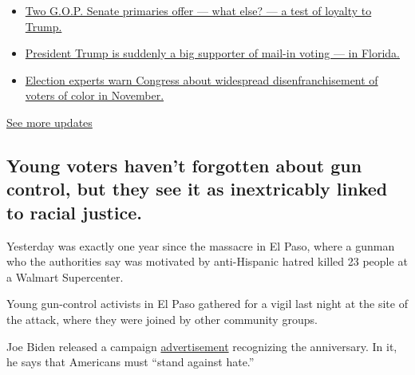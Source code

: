 \begin{itemize}
\tightlist
\item
  \href{https://www.nytimes.com/2020/08/04/us/elections/primary-election-michigan-arizona-kansas.html?action=click\&pgtype=Article\&state=default\&region=MAIN_CONTENT_1\&context=storylines_live_updates\#link-3924dd44}{Two
  G.O.P. Senate primaries offer --- what else? --- a test of loyalty to
  Trump.}
\item
  \href{https://www.nytimes.com/2020/08/04/us/elections/primary-election-michigan-arizona-kansas.html?action=click\&pgtype=Article\&state=default\&region=MAIN_CONTENT_1\&context=storylines_live_updates\#link-32b39e33}{President
  Trump is suddenly a big supporter of mail-in voting --- in Florida.}
\item
  \href{https://www.nytimes.com/2020/08/04/us/elections/primary-election-michigan-arizona-kansas.html?action=click\&pgtype=Article\&state=default\&region=MAIN_CONTENT_1\&context=storylines_live_updates\#link-6d019753}{Election
  experts warn Congress about widespread disenfranchisement of voters of
  color in November.}
\end{itemize}

\href{https://www.nytimes.com/2020/08/04/us/elections/primary-election-michigan-arizona-kansas.html?action=click\&pgtype=Article\&state=default\&region=MAIN_CONTENT_1\&context=storylines_live_updates}{See
more updates}

\hypertarget{young-voters-havent-forgotten-about-gun-control-but-they-see-it-as-inextricably-linked-to-racial-justice}{%
\subsection{Young voters haven't forgotten about gun control, but they
see it as inextricably linked to racial
justice.}\label{young-voters-havent-forgotten-about-gun-control-but-they-see-it-as-inextricably-linked-to-racial-justice}}

Yesterday was exactly one year since the massacre in El Paso, where a
gunman who the authorities say was motivated by anti-Hispanic hatred
killed 23 people at a Walmart Supercenter.

Young gun-control activists in El Paso gathered for a vigil last night
at the site of the attack, where they were joined by other community
groups.

Joe Biden released a campaign
\href{https://www.youtube.com/watch?v=BbQQEPwarmU}{advertisement}
recognizing the anniversary. In it, he says that Americans must ``stand
against hate.''

